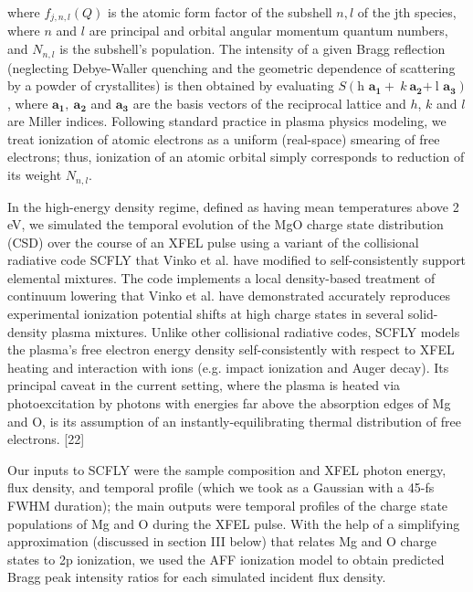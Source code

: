 where \(f_{j,n,l}\left( Q \right)\) is the atomic form factor of the
subshell \(n,l\) of the jth species, where \(n\) and \(l\) are principal
and orbital angular momentum quantum numbers, and \(N_{n,l}\) is the
subshell's population. The intensity of a given Bragg reflection
(neglecting Debye-Waller quenching and the geometric dependence of
scattering by a powder of crystallites) is then obtained by evaluating
\(S\left( \text{h\ }\mathbf{a}_{\mathbf{1}} + \ k\ \mathbf{a}_{\mathbf{2}}\mathbf{+ \ }\text{l\ }\mathbf{a}_{\mathbf{3}} \right)\),
where \(\mathbf{a}_{\mathbf{1}}\mathbf{,\ }\mathbf{a}_{\mathbf{2}}\) and
\(\mathbf{a}_{\mathbf{3}}\) are the basis vectors of the reciprocal
lattice and \(h\), \(k\) and \(l\) are Miller indices. Following
standard practice in plasma physics modeling, we treat ionization of
atomic electrons as a uniform (real-space) smearing of free electrons;
thus, ionization of an atomic orbital simply corresponds to reduction of
its weight \(N_{n,l}\).

In the high-energy density regime, defined as having mean temperatures
above 2 eV, we simulated the temporal evolution of the MgO charge state
distribution (CSD) over the course of an XFEL pulse using a variant of
the collisional radiative code SCFLY that Vinko et al. have modified to
self-consistently support elemental mixtures. \cite{CIRICOSTA2016MEASUREMENTS} The code
implements a local density-based treatment of continuum lowering that
Vinko et al. have demonstrated accurately reproduces experimental
ionization potential shifts at high charge states in several
solid-density plasma mixtures. Unlike other collisional radiative codes,
SCFLY models the plasma's free electron energy density self-consistently
with respect to XFEL heating and interaction with ions (e.g. impact
ionization and Auger decay). Its principal caveat in the current
setting, where the plasma is heated via photoexcitation by photons with
energies far above the absorption edges of Mg and O, is its assumption
of an instantly-equilibrating thermal distribution of free electrons.
{[}22{]}

Our inputs to SCFLY were the sample composition and XFEL photon energy,
flux density, and temporal profile (which we took as a Gaussian with a
45-fs FWHM duration); the main outputs were temporal profiles of the
charge state populations of Mg and O during the XFEL pulse. With the
help of a simplifying approximation (discussed in section III below)
that relates Mg and O charge states to 2p ionization, we used the AFF
ionization model to obtain predicted Bragg peak intensity ratios for
each simulated incident flux density.

